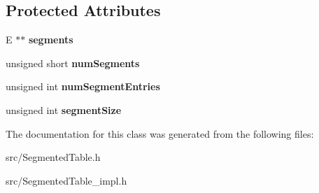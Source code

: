 \subsection*{Protected Attributes}
\begin{DoxyCompactItemize}
\item 
\hypertarget{class_segmented_table_a5392684b7b00def8299a72e9333e836c}{}E $\ast$$\ast$ {\bfseries segments}\label{class_segmented_table_a5392684b7b00def8299a72e9333e836c}

\item 
\hypertarget{class_segmented_table_af903ed4b4f8ddd86efacab1a33637072}{}unsigned short {\bfseries num\+Segments}\label{class_segmented_table_af903ed4b4f8ddd86efacab1a33637072}

\item 
\hypertarget{class_segmented_table_aaf95edc851a1c9e3a6f9dfbcce04ecda}{}unsigned int {\bfseries num\+Segment\+Entries}\label{class_segmented_table_aaf95edc851a1c9e3a6f9dfbcce04ecda}

\item 
\hypertarget{class_segmented_table_ae8c3c314960daeb5382f04a5212c1e77}{}unsigned int {\bfseries segment\+Size}\label{class_segmented_table_ae8c3c314960daeb5382f04a5212c1e77}

\end{DoxyCompactItemize}


The documentation for this class was generated from the following files\+:\begin{DoxyCompactItemize}
\item 
src/Segmented\+Table.\+h\item 
src/Segmented\+Table\+\_\+impl.\+h\end{DoxyCompactItemize}
